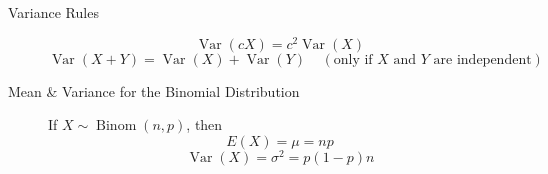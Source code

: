 \documentclass[11pt]{article}
\newcommand{\Var}{\operatorname{Var}}
\newcommand{\ds}{\displaystyle}
\begin{document}
\begin{description}
\item[Variance Rules]
$$\Var(cX) = c^2 \Var(X)$$
$$\Var(X+Y) = \Var(X)+\Var(Y) ~~~~~ ( \text{only if } X \text{ and } Y \text{ are independent})$$
\vfill


\item[Mean \& Variance for the Binomial Distribution] If $X \sim \operatorname{Binom}(n,p)$, then
$$E(X) = \mu = np$$
$$\Var(X) = \sigma^2 = p(1-p)n$$
\vfill





\end{description}
\end{document}
